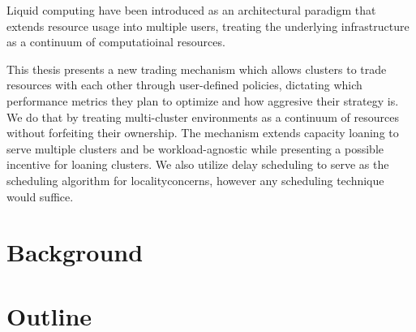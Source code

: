 Liquid computing have been introduced as an architectural paradigm that extends
resource usage into multiple users, treating the underlying infrastructure as a
continuum of computatioinal resources. 

This thesis presents a new trading mechanism which allows clusters to trade
resources with each other through user-defined policies, dictating which
performance metrics they plan to optimize and how aggresive their strategy is.
We do that by treating multi-cluster environments as a continuum of resources
without forfeiting their ownership. The mechanism extends capacity loaning to
serve multiple clusters and be workload-agnostic while presenting a possible
incentive for loaning clusters. We also utilize delay scheduling to serve as
the scheduling algorithm for localityconcerns, however any scheduling technique
would suffice.

\section{Background}
\section{Outline}
